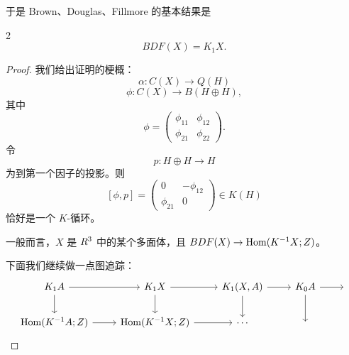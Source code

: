 于是 Brown、Douglas、Fillmore 的基本结果是

\begin{thm}{2}
\[
  BDF(X) = K_1 X.
\]
\end{thm}


\begin{proof}
我们给出证明的梗概：
\[
  \alpha : C(X) \to Q(H)
\]
\[
  \phi : C(X) \to B(H \oplus H),
\]
其中
\[
  \phi = \begin{pmatrix} \phi_{11} & \phi_{12} \\ \phi_{21} & \phi_{22} \end{pmatrix}.
\]
令
\[
  p : H \oplus H \to H
\]
为到第一个因子的投影。则
\[
  [\phi,p] = \begin{pmatrix} 0 & -\phi_{12} \\ \phi_{21} & 0 \end{pmatrix} \in K(H)
\]
恰好是一个 $K$-循环。

一般而言，$X$ 是 $R^3$ 中的某个多面体，且 $BDF(X) \to \operatorname{Hom}(K^{-1}X; Z)$。

下面我们继续做一点图追踪：
\[
  \begin{tikzcd}
    K_1 A \arrow[r] \arrow[d] & K_1 X \arrow[r] \arrow[d] & K_1(X,A) \arrow[r] \arrow[d] & K_0 A \arrow[r] \arrow[d] & \null \\
    \Hom(K^{-1}A;\Z) \arrow[r] & \Hom(K^{-1}X;\Z) \arrow[r] & \cdots & \null & \null
  \end{tikzcd}
\]
\end{proof}


